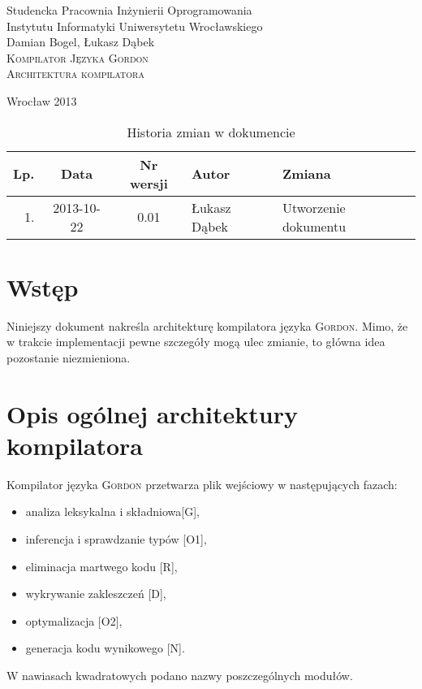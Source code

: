 \documentclass{documentation}
\begin{document}
\begin{titlepage}
\begin{center}
Studencka Pracownia Inżynierii Oprogramowania\\
Instytutu Informatyki Uniwersytetu Wrocławskiego\\[6cm]

Damian Bogel, Łukasz Dąbek\\[1cm]
\textsc{\LARGE Kompilator Języka Gordon}\\[0.5cm]
\textsc{\large Architektura kompilatora}

\vfill
Wrocław 2013 \\[2.5cm]

\end{center}
\end{titlepage}

\newpage
\begin{table}
	\centering
	\caption{Historia zmian w dokumencie}
		\begin{tabular}{|r|c|c|l|l|}
		\hline
		Lp.  & Data       & Nr wersji & Autor                 & Zmiana \\ \hline
		1.   & 2013-10-22 & 0.01 & Łukasz Dąbek & Utworzenie dokumentu \\ \hline
	\end{tabular}
\end{table}
\newpage

\tableofcontents
\setcounter{page}{2}

\newpage

\section{Wstęp}
\noindent Niniejszy dokument nakreśla architekturę kompilatora języka \textsc{Gordon}. Mimo, że
w trakcie implementacji pewne szczegóły mogą ulec zmianie, to główna idea pozostanie
niezmieniona.

\section{Opis ogólnej architektury kompilatora}
\noindent Kompilator języka \textsc{Gordon} przetwarza plik wejściowy w następujących fazach:
\begin{itemize}
    \item analiza leksykalna i składniowa[G],
    \item inferencja i sprawdzanie typów [O1],
    \item eliminacja martwego kodu [R],
    \item wykrywanie zakleszczeń [D], 
    \item optymalizacja [O2],
    \item generacja kodu wynikowego [N].
\end{itemize}
W nawiasach kwadratowych podano nazwy poszczególnych modułów.
\end{document}
